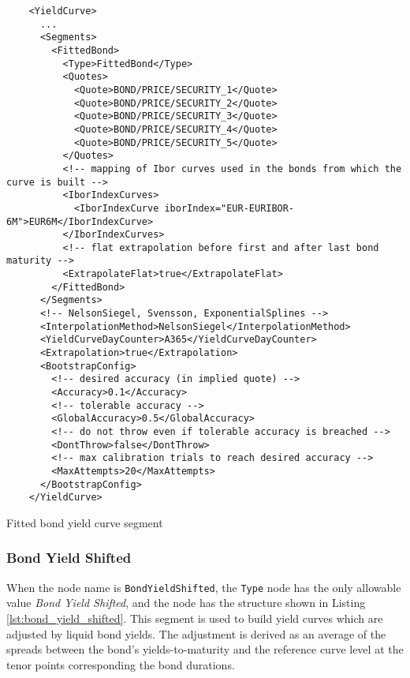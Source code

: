 \begin{listing}[H]
\begin{verbatim}
    <YieldCurve>
      ...
      <Segments>
        <FittedBond>
          <Type>FittedBond</Type>
          <Quotes>
            <Quote>BOND/PRICE/SECURITY_1</Quote>
            <Quote>BOND/PRICE/SECURITY_2</Quote>
            <Quote>BOND/PRICE/SECURITY_3</Quote>
            <Quote>BOND/PRICE/SECURITY_4</Quote>
            <Quote>BOND/PRICE/SECURITY_5</Quote>
          </Quotes>
          <!-- mapping of Ibor curves used in the bonds from which the curve is built -->
          <IborIndexCurves>
            <IborIndexCurve iborIndex="EUR-EURIBOR-6M">EUR6M</IborIndexCurve>
          </IborIndexCurves>
          <!-- flat extrapolation before first and after last bond maturity -->
          <ExtrapolateFlat>true</ExtrapolateFlat>
        </FittedBond>
      </Segments>
      <!-- NelsonSiegel, Svensson, ExponentialSplines -->
      <InterpolationMethod>NelsonSiegel</InterpolationMethod>
      <YieldCurveDayCounter>A365</YieldCurveDayCounter>
      <Extrapolation>true</Extrapolation>
      <BootstrapConfig>
        <!-- desired accuracy (in implied quote) -->
        <Accuracy>0.1</Accuracy>
        <!-- tolerable accuracy -->
        <GlobalAccuracy>0.5</GlobalAccuracy>
        <!-- do not throw even if tolerable accuracy is breached -->
        <DontThrow>false</DontThrow>
        <!-- max calibration trials to reach desired accuracy -->
        <MaxAttempts>20</MaxAttempts>
      </BootstrapConfig>
    </YieldCurve>
\end{verbatim}
\caption{Fitted bond yield curve segment}
\label{lst:fitted_bond_segment}
\end{listing}

\subsubsection*{Bond Yield Shifted}
\label{sec:bond_yield_shifted}

When the node name is \lstinline!BondYieldShifted!, the \lstinline!Type! node has the only allowable value \emph{Bond Yield Shifted},
and the node has the structure shown in Listing \ref{lst:bond_yield_shifted}. This segment is used to build yield
curves which are adjusted by liquid bond yields. The adjustment is derived as an average of the spreads between the bond's
yields-to-maturity and the reference curve level at the tenor points corresponding the bond durations.

